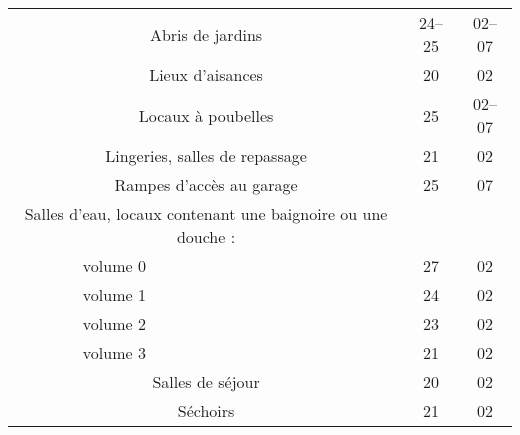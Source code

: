 \begin{minipage}[t]{0.49\linewidth}
\begin{tabularx}{\textwidth}[t]{c X c c}
\multicolumn{2}{p{4.8cm}}{Abris de jardins	}																			& 24--25			& 02--07 \\
\multicolumn{2}{p{4.8cm}}{Lieux d'aisances}																			& 20				& 02 \\
\multicolumn{2}{p{4.8cm}}{Locaux à poubelles}																		& 25				& 02--07 \\
\multicolumn{2}{p{4.8cm}}{Lingeries, salles de repassage}														& 21				& 02 \\
\multicolumn{2}{p{4.8cm}}{Rampes d'accès au garage}																& 25				& 07 \\
\multicolumn{2}{p{4.8cm}}{Salles d'eau, locaux contenant une baignoire ou une douche :	}		& 					& \\
& volume 0																& 27				& 02 \\
& volume 1																& 24				& 02 \\
& volume 2																& 23				& 02 \\
& volume 3																& 21				& 02 \\
\multicolumn{2}{p{4.8cm}}{Salles de séjour}																				& 20				& 02 \\
\multicolumn{2}{p{4.8cm}}{Séchoirs}																						& 21				& 02 \\
\end{tabularx}
\end{minipage}
\hfill
